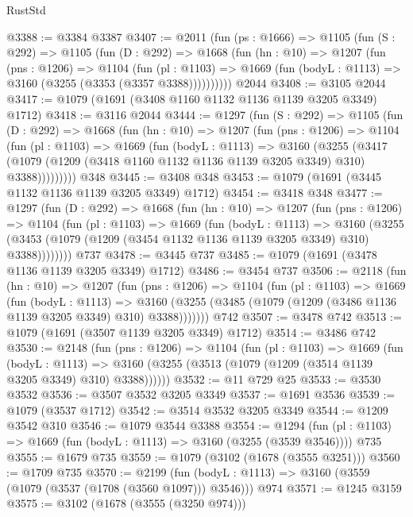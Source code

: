 \begin{lexlean}{RustStd}
\begin{coremodule}
@3388 := @3384 @3387
@3407 := @2011
    (fun (ps : @1666) =>
    @1105
      (fun (S : @292) =>
      @1105
        (fun (D : @292) =>
        @1668
          (fun (hn : @10) =>
          @1207
            (fun (pns : @1206) =>
            @1104
              (fun (pl : @1103) =>
              @1669 (fun (bodyL : @1113) => @3160 (@3255 (@3353 (@3357 @3388))))))))))
    @2044
@3408 := @3105 @2044
@3417 := @1079 (@1691 (@3408 @1160 @1132 @1136 @1139 @3205 @3349) @1712)
@3418 := @3116 @2044
@3444 := @1297
    (fun (S : @292) =>
    @1105
      (fun (D : @292) =>
      @1668
        (fun (hn : @10) =>
        @1207
          (fun (pns : @1206) =>
          @1104
            (fun (pl : @1103) =>
            @1669
              (fun (bodyL : @1113) =>
              @3160
                (@3255
                  (@3417
                    (@1079 (@1209 (@3418 @1160 @1132 @1136 @1139 @3205 @3349) @310) @3388)))))))))
    @348
@3445 := @3408 @348
@3453 := @1079 (@1691 (@3445 @1132 @1136 @1139 @3205 @3349) @1712)
@3454 := @3418 @348
@3477 := @1297
    (fun (D : @292) =>
    @1668
      (fun (hn : @10) =>
      @1207
        (fun (pns : @1206) =>
        @1104
          (fun (pl : @1103) =>
          @1669
            (fun (bodyL : @1113) =>
            @3160
              (@3255 (@3453 (@1079 (@1209 (@3454 @1132 @1136 @1139 @3205 @3349) @310) @3388))))))))
    @737
@3478 := @3445 @737
@3485 := @1079 (@1691 (@3478 @1136 @1139 @3205 @3349) @1712)
@3486 := @3454 @737
@3506 := @2118
    (fun (hn : @10) =>
    @1207
      (fun (pns : @1206) =>
      @1104
        (fun (pl : @1103) =>
        @1669
          (fun (bodyL : @1113) =>
          @3160 (@3255 (@3485 (@1079 (@1209 (@3486 @1136 @1139 @3205 @3349) @310) @3388)))))))
    @742
@3507 := @3478 @742
@3513 := @1079 (@1691 (@3507 @1139 @3205 @3349) @1712)
@3514 := @3486 @742
@3530 := @2148
    (fun (pns : @1206) =>
    @1104
      (fun (pl : @1103) =>
      @1669
        (fun (bodyL : @1113) =>
        @3160 (@3255 (@3513 (@1079 (@1209 (@3514 @1139 @3205 @3349) @310) @3388))))))
@3532 := @11 @729 @25
@3533 := @3530 @3532
@3536 := @3507 @3532 @3205 @3349
@3537 := @1691 @3536
@3539 := @1079 (@3537 @1712)
@3542 := @3514 @3532 @3205 @3349
@3544 := @1209 @3542 @310
@3546 := @1079 @3544 @3388
@3554 := @1294 (fun (pl : @1103) => @1669 (fun (bodyL : @1113) => @3160 (@3255 (@3539 @3546)))) @735
@3555 := @1679 @735
@3559 := @1079 (@3102 (@1678 (@3555 @3251)))
@3560 := @1709 @735
@3570 := @2199
    (fun (bodyL : @1113) => @3160 (@3559 (@1079 (@3537 (@1708 (@3560 @1097))) @3546)))
    @974
@3571 := @1245 @3159
@3575 := @3102 (@1678 (@3555 (@3250 @974)))

\end{coremodule}
\end{lexlean}
